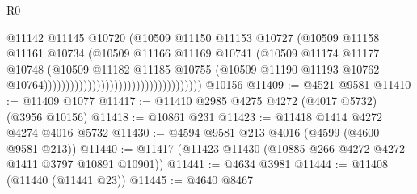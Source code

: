 \begin{lexlean}{R0}
\begin{coremodule}
                                                                @11142
                                                                @11145
                                                                @10720
                                                                (@10509
                                                                  @11150
                                                                  @11153
                                                                  @10727
                                                                  (@10509
                                                                    @11158
                                                                    @11161
                                                                    @10734
                                                                    (@10509
                                                                      @11166
                                                                      @11169
                                                                      @10741
                                                                      (@10509
                                                                        @11174
                                                                        @11177
                                                                        @10748
                                                                        (@10509
                                                                          @11182
                                                                          @11185
                                                                          @10755
                                                                          (@10509
                                                                            @11190
                                                                            @11193
                                                                            @10762
                                                                            @10764))))))))))))))))))))))))))))))))))))
    @10156
@11409 := @4521 @9581
@11410 := @11409 @1077
@11417 := @11410 @2985 @4275 @4272 (@4017 @5732) (@3956 @10156)
@11418 := @10861 @231
@11423 := @11418 @1414 @4272 @4274 @4016 @5732
@11430 := @4594 @9581 @213 @4016 (@4599 (@4600 @9581 @213))
@11440 := @11417 (@11423 @11430 (@10885 @266 @4272 @4272 @1411 @3797 @10891 @10901))
@11441 := @4634 @3981
@11444 := @11408 (@11440 (@11441 @23))
@11445 := @4640 @8467

\end{coremodule}
\end{lexlean}
